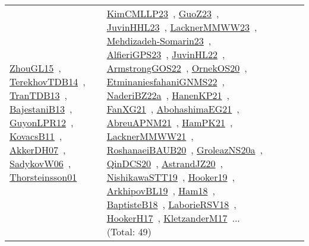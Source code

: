 {\begin{longtable}{lp{3cm}>{\raggedright\arraybackslash}p{6cm}>{\raggedright\arraybackslash}p{6cm}>{\raggedright\arraybackslash}p{8cm}}
\href{../works/ZhouGL15.pdf}{ZhouGL15}~\cite{ZhouGL15}, \href{../works/TerekhovTDB14.pdf}{TerekhovTDB14}~\cite{TerekhovTDB14}, \href{../works/TranTDB13.pdf}{TranTDB13}~\cite{TranTDB13}, \href{../works/BajestaniB13.pdf}{BajestaniB13}~\cite{BajestaniB13}, \href{../works/GuyonLPR12.pdf}{GuyonLPR12}~\cite{GuyonLPR12}, \href{../works/KovacsB11.pdf}{KovacsB11}~\cite{KovacsB11}, \href{../works/AkkerDH07.pdf}{AkkerDH07}~\cite{AkkerDH07}, \href{../works/SadykovW06.pdf}{SadykovW06}~\cite{SadykovW06}, \href{../works/Thorsteinsson01.pdf}{Thorsteinsson01}~\cite{Thorsteinsson01} & \href{../works/KimCMLLP23.pdf}{KimCMLLP23}~\cite{KimCMLLP23}, \href{../works/GuoZ23.pdf}{GuoZ23}~\cite{GuoZ23}, \href{../works/JuvinHHL23.pdf}{JuvinHHL23}~\cite{JuvinHHL23}, \href{../works/LacknerMMWW23.pdf}{LacknerMMWW23}~\cite{LacknerMMWW23}, \href{../works/Mehdizadeh-Somarin23.pdf}{Mehdizadeh-Somarin23}~\cite{Mehdizadeh-Somarin23}, \href{../works/AlfieriGPS23.pdf}{AlfieriGPS23}~\cite{AlfieriGPS23}, \href{../works/JuvinHL22.pdf}{JuvinHL22}~\cite{JuvinHL22}, \href{../works/ArmstrongGOS22.pdf}{ArmstrongGOS22}~\cite{ArmstrongGOS22}, \href{../works/OrnekOS20.pdf}{OrnekOS20}~\cite{OrnekOS20}, \href{../works/EtminaniesfahaniGNMS22.pdf}{EtminaniesfahaniGNMS22}~\cite{EtminaniesfahaniGNMS22}, \href{../works/NaderiBZ22a.pdf}{NaderiBZ22a}~\cite{NaderiBZ22a}, \href{../works/HanenKP21.pdf}{HanenKP21}~\cite{HanenKP21}, \href{../works/FanXG21.pdf}{FanXG21}~\cite{FanXG21}, \href{../works/AbohashimaEG21.pdf}{AbohashimaEG21}~\cite{AbohashimaEG21}, \href{../works/AbreuAPNM21.pdf}{AbreuAPNM21}~\cite{AbreuAPNM21}, \href{../works/HamPK21.pdf}{HamPK21}~\cite{HamPK21}, \href{../works/LacknerMMWW21.pdf}{LacknerMMWW21}~\cite{LacknerMMWW21}, \href{../works/RoshanaeiBAUB20.pdf}{RoshanaeiBAUB20}~\cite{RoshanaeiBAUB20}, \href{../works/GroleazNS20a.pdf}{GroleazNS20a}~\cite{GroleazNS20a}, \href{../works/QinDCS20.pdf}{QinDCS20}~\cite{QinDCS20}, \href{../works/AstrandJZ20.pdf}{AstrandJZ20}~\cite{AstrandJZ20}, \href{../works/NishikawaSTT19.pdf}{NishikawaSTT19}~\cite{NishikawaSTT19}, \href{../works/Hooker19.pdf}{Hooker19}~\cite{Hooker19}, \href{../works/ArkhipovBL19.pdf}{ArkhipovBL19}~\cite{ArkhipovBL19}, \href{../works/Ham18.pdf}{Ham18}~\cite{Ham18}, \href{../works/BaptisteB18.pdf}{BaptisteB18}~\cite{BaptisteB18}, \href{../works/LaborieRSV18.pdf}{LaborieRSV18}~\cite{LaborieRSV18}, \href{../works/HookerH17.pdf}{HookerH17}~\cite{HookerH17}, \href{../works/KletzanderM17.pdf}{KletzanderM17}~\cite{KletzanderM17}... (Total: 49)\\

\end{longtable}}
